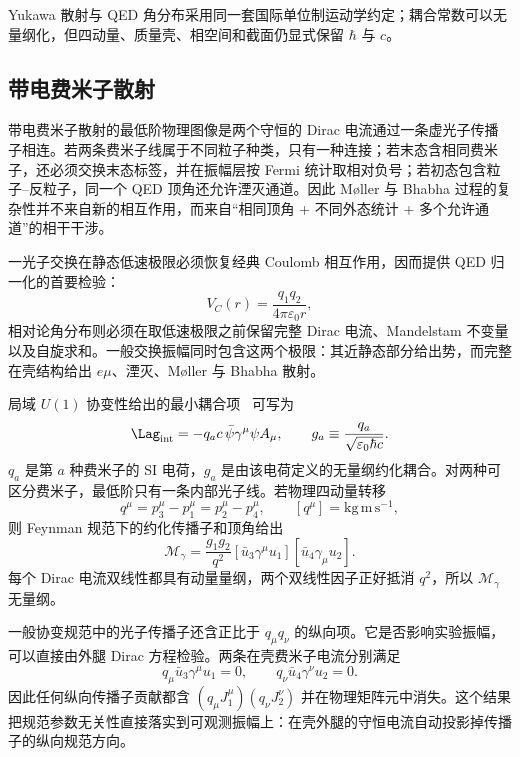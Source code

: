 


Yukawa 散射与 QED 角分布采用同一套国际单位制运动学约定；耦合常数可以无量纲化，但四动量、质量壳、相空间和截面仍显式保留 $\hbar$ 与 $c$。



\subsection{带电费米子散射}

带电费米子散射的最低阶物理图像是两个守恒的 Dirac 电流通过一条虚光子传播子相连。若两条费米子线属于不同粒子种类，只有一种连接；若末态含相同费米子，还必须交换末态标签，并在振幅层按 Fermi 统计取相对负号；若初态包含粒子--反粒子，同一个 QED 顶角还允许湮灭通道。因此 M{\o}ller 与 Bhabha 过程的复杂性并不来自新的相互作用，而来自“相同顶角 + 不同外态统计 + 多个允许通道”的相干干涉。

一光子交换在静态低速极限必须恢复经典 Coulomb 相互作用，因而提供 QED 归一化的首要检验：
\[
 V_C(r)=\frac{q_1q_2}{4\pi\varepsilon_0r},
\]
相对论角分布则必须在取低速极限之前保留完整 Dirac 电流、Mandelstam 不变量以及自旋求和。一般交换振幅同时包含这两个极限：其近静态部分给出势，而完整在壳结构给出 $e\mu$、湮灭、M{\o}ller 与 Bhabha 散射。

局域 $U(1)$ 协变性给出的最小耦合项~ 可写为
\begin{equation}
 \Lag_{\rm int}=-q_ac\,\bar\psi\gamma^\mu\psi A_\mu,
 \qquad
 g_a\equiv\frac{q_a}{\sqrt{\varepsilon_0\hbar c}}.
 \label{eq:qed-Lint-r13}
\end{equation}
$q_a$ 是第 $a$ 种费米子的 SI 电荷，$g_a$ 是由该电荷定义的无量纲约化耦合。对两种可区分费米子，最低阶只有一条内部光子线。若物理四动量转移
\begin{equation}
 q^\mu=p_3^\mu-p_1^\mu=p_2^\mu-p_4^\mu,
 \qquad [q^\mu]=\mathrm{kg\,m\,s^{-1}},
 \label{eq:qed-transfer-q-r13}
\end{equation}
则 Feynman 规范下的约化传播子和顶角给出
\begin{equation}
 \boxed{
 \mathcal M_\gamma
 =\frac{g_1g_2}{q^2}
 [\bar u_3\gamma^\mu u_1]
 [\bar u_4\gamma_\mu u_2].}
 \label{eq:qed-reduced-exchange-r13}
\end{equation}
每个 Dirac 电流双线性都具有动量量纲，两个双线性因子正好抵消 $q^2$，所以 $\mathcal M_\gamma$ 无量纲。

一般协变规范中的光子传播子还含正比于 $q_\mu q_\nu$ 的纵向项。它是否影响实验振幅，可以直接由外腿 Dirac 方程检验。两条在壳费米子电流分别满足
\begin{equation}
 \boxed{
 q_\mu\bar u_3\gamma^\mu u_1=0,
 \qquad
 q_\nu\bar u_4\gamma^\nu u_2=0.}
 \label{eq:current-conservation-on-shell-r13}
\end{equation}
因此任何纵向传播子贡献都含 $(q_\mu J_1^\mu)(q_\nu J_2^\nu)$ 并在物理矩阵元中消失。这个结果把规范参数无关性直接落实到可观测振幅上：在壳外腿的守恒电流自动投影掉传播子的纵向规范方向。

